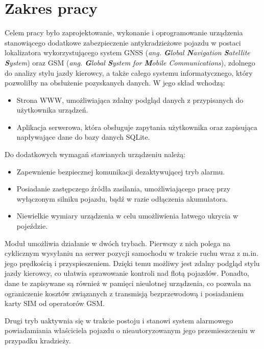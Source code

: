 \section{Zakres pracy}
\label{project_sketch}
Celem pracy było zaprojektowanie, wykonanie i oprogramowanie urządzenia stanowiącego dodatkowe zabezpieczenie antykradzieżowe pojazdu w postaci lokalizatora wykorzystującego system GNSS (\textit{ang. \textbf{G}lobal \textbf{N}avigation \textbf{S}atellite \textbf{S}ystem}) oraz GSM (\textit{ang. \textbf{G}lobal \textbf{S}ystem for \textbf{M}obile Communications}), zdolnego do analizy stylu jazdy kierowcy, a także całego systemu informatycznego, który pozwoliłby na obsłużenie pozyskanych danych. W jego skład wchodzą:

\begin{itemize}
\item Strona WWW, umożliwiająca zdalny podgląd danych z przypisanych do użytkownika urządzeń.
\item Aplikacja serwerowa, która obsługuje zapytania użytkownika oraz zapisująca napływające dane do bazy danych SQLite.
\end{itemize}

Do dodatkowych wymagań stawianych urządzeniu należą:

\begin{itemize}
\item Zapewnienie bezpiecznej komunikacji dezaktywującej tryb alarmu.
\item Posiadanie zastępczego źródła zasilania, umożliwiającego pracę przy wyłączonym silniku pojazdu, bądź w razie odłączenia akumulatora.
\item Niewielkie wymiary urządzenia w celu umożliwienia łatwego ukrycia w pojeździe. 
\end{itemize}

Moduł umożliwia działanie w dwóch trybach. Pierwszy z nich polega na cyklicznym wysyłaniu na serwer pozycji samochodu w trakcie ruchu wraz z m.in. jego prędkością i przyspieszeniem. Dzięki temu możliwy jest zdalny podgląd stylu jazdy kierowcy, co ułatwia sprawowanie kontroli nad flotą pojazdów. Ponadto, dane te zapisywane są również w pamięci nieulotnej urządzenia, co pozwala na ograniczenie kosztów związanych z transmisją bezprzewodową i posiadaniem karty SIM od operatorów GSM. 

Drugi tryb uaktywnia się w trakcie postoju i stanowi system alarmowego powiadamiania właściciela pojazdu o nieautoryzowanym jego przemieszczeniu w przypadku kradzieży.

